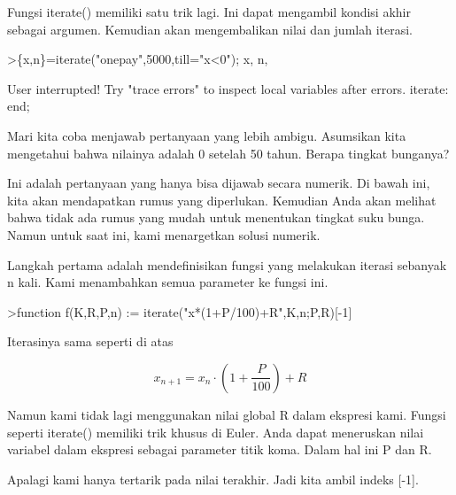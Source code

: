 \documentclass[a4paper,10pt]{article}
\begin{document}
\begin{eulernotebook}
\begin{eulercomment}
\begin{eulercomment}
\begin{eulercomment}
\begin{eulercomment}
\begin{eulercomment}
\begin{eulercomment}
\begin{eulercomment}
\begin{eulercomment}
\begin{eulercomment}
\begin{eulercomment}
\begin{eulercomment}
\begin{eulercomment}
\begin{eulercomment}
Fungsi iterate() memiliki satu trik lagi. Ini dapat mengambil kondisi
akhir sebagai argumen. Kemudian akan mengembalikan nilai dan jumlah
iterasi.
\end{eulercomment}
\begin{eulerprompt}
>\{x,n\}=iterate("onepay",5000,till="x<0"); x, n,
\end{eulerprompt}
\begin{euleroutput}
  User interrupted!
  Try "trace errors" to inspect local variables after errors.
  iterate:
      end;
\end{euleroutput}
\begin{eulercomment}
Mari kita coba menjawab pertanyaan yang lebih ambigu. Asumsikan kita
mengetahui bahwa nilainya adalah 0 setelah 50 tahun. Berapa tingkat
bunganya?

Ini adalah pertanyaan yang hanya bisa dijawab secara numerik. Di bawah
ini, kita akan mendapatkan rumus yang diperlukan. Kemudian Anda akan
melihat bahwa tidak ada rumus yang mudah untuk menentukan tingkat suku
bunga. Namun untuk saat ini, kami menargetkan solusi numerik.

Langkah pertama adalah mendefinisikan fungsi yang melakukan iterasi
sebanyak n kali. Kami menambahkan semua parameter ke fungsi ini.
\end{eulercomment}
\begin{eulerprompt}
>function f(K,R,P,n) := iterate("x*(1+P/100)+R",K,n;P,R)[-1]
\end{eulerprompt}
\begin{eulercomment}
Iterasinya sama seperti di atas

\end{eulercomment}
\begin{eulerformula}
\[
x_{n+1} = x_n \cdot \left(1+ \frac{P}{100}\right) + R
\]
\end{eulerformula}
\begin{eulercomment}
Namun kami tidak lagi menggunakan nilai global R dalam ekspresi kami.
Fungsi seperti iterate() memiliki trik khusus di Euler. Anda dapat
meneruskan nilai variabel dalam ekspresi sebagai parameter titik koma.
Dalam hal ini P dan R.

Apalagi kami hanya tertarik pada nilai terakhir. Jadi kita ambil
indeks [-1].


\end{eulercomment}
\end{eulercomment}
\end{eulercomment}
\end{eulercomment}
\end{eulercomment}
\end{eulercomment}
\end{eulercomment}
\end{eulercomment}
\end{eulercomment}
\end{eulercomment}
\end{eulercomment}
\end{eulercomment}
\end{eulercomment}
\end{eulernotebook}
\end{document}
